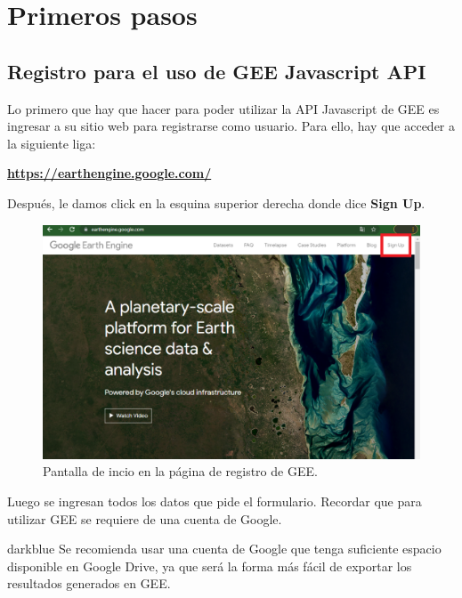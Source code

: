 \documentclass[
  12pt,
  letterpaper,
  twoside]{book}
\begin{document}
\newpage

\hypertarget{primeros-pasos}{%
\chapter{Primeros pasos}\label{primeros-pasos}}

\hypertarget{registro-para-el-uso-de-gee-javascript-api}{%
\section{Registro para el uso de GEE Javascript API}\label{registro-para-el-uso-de-gee-javascript-api}}

Lo primero que hay que hacer para poder utilizar la API Javascript de GEE es ingresar a su sitio web para registrarse como usuario. Para ello, hay que acceder a la siguiente liga:

\textbf{\url{https://earthengine.google.com/}}

Después, le damos click en la esquina superior derecha donde dice \textbf{Sign Up}.

\begin{figure}

{\centering \includegraphics[width=1\linewidth]{Img/Signup} 

}

\caption{Pantalla de incio en la página de registro de GEE.}\label{fig:unnamed-chunk-2}
\end{figure}

Luego se ingresan todos los datos que pide el formulario. Recordar que para utilizar GEE se requiere de una cuenta de Google.

\begin{bluebox2}

\begin{awesomeblock}{5pt}{\faLightbulb}{darkblue}
Se recomienda usar una cuenta de Google que tenga suficiente espacio disponible en Google Drive, ya que será la forma más fácil de exportar los resultados generados en GEE.

\end{awesomeblock}

\end{bluebox2}
\end{document}
